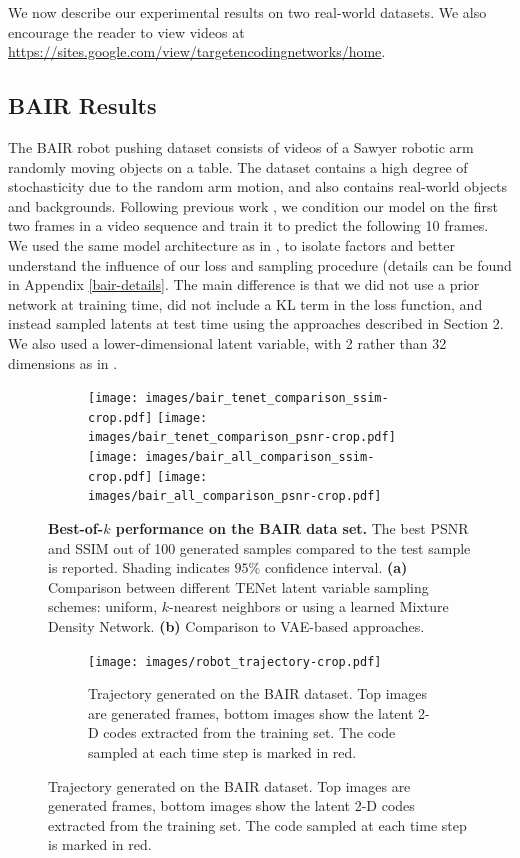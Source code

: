 \documentclass{article}
\newcommand{\modelname}{TENet }
\begin{document}
We now describe our experimental results on two real-world datasets.
We also encourage the reader to view videos at \url{https://sites.google.com/view/targetencodingnetworks/home}.


\subsection{BAIR Results}

The BAIR robot pushing dataset \citep{Ebert17} consists of videos of a Sawyer robotic arm randomly moving objects on a table.
The dataset contains a high degree of stochasticity due to the random arm motion, and also contains real-world objects and backgrounds.
Following previous work \citep{Babaeizadeh2018, Denton2018}, we condition our model on the first two frames in a video sequence and train it to predict the following 10 frames.
We used the same model architecture as in \citep{Denton2018}, to isolate factors and better understand the influence of our loss and sampling procedure (details can be found in Appendix \ref{bair-details}.
The main difference is that we did not use a prior network at training time, did not include a KL term in the loss function, and instead sampled latents at test time using the approaches described in Section 2. We also used a lower-dimensional latent variable, with 2 rather than 32 dimensions as in \citep{Denton2018}.

\begin{figure}
  \centering
  \begin{subfigure}[b]{\textwidth}
    \centering
  \texttt{[image: images/bair\_tenet\_comparison\_ssim-crop.pdf]}
  \texttt{[image: images/bair\_tenet\_comparison\_psnr-crop.pdf]}
  \texttt{[image: images/bair\_all\_comparison\_ssim-crop.pdf]}
  \texttt{[image: images/bair\_all\_comparison\_psnr-crop.pdf]}
  \caption{}
  \end{subfigure}
  \caption{
    \textbf{Best-of-$k$ performance on the BAIR data set.}
    The best PSNR and SSIM out of 100 generated samples compared to the test sample is reported.
    Shading indicates $95\%$ confidence interval.
    \textbf{(a)} Comparison between different \modelname latent variable sampling schemes: uniform, $k$-nearest neighbors or using a learned Mixture Density Network.
    \textbf{(b)} Comparison to VAE-based approaches.
  }
  \label{bair}
\end{figure}





\begin{figure}
  \centering
  \begin{subfigure}[b]{\textwidth}
    \centering
  \texttt{[image: images/robot\_trajectory-crop.pdf]}
  \caption{Trajectory generated on the BAIR dataset. Top images are generated frames, bottom images show the latent 2-D codes extracted from the training set. The code sampled at each time step is marked in red.}
    \label{robot-trajectory}
  \end{subfigure}
\end{figure}
\end{document}
